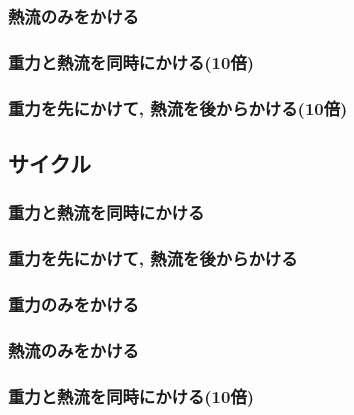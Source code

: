 

\subsubsection{熱流のみをかける}



\subsubsection{重力と熱流を同時にかける(10倍)}

\subsubsection{重力を先にかけて, 熱流を後からかける(10倍)}




\subsection{サイクル}

\subsubsection{重力と熱流を同時にかける}



\subsubsection{重力を先にかけて, 熱流を後からかける}



\subsubsection{重力のみをかける}



\subsubsection{熱流のみをかける}



\subsubsection{重力と熱流を同時にかける(10倍)}

